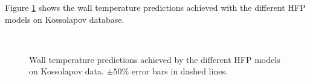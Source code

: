 \npar

Figure \ref{fig:HFP_koss} shows the wall temperature predictions achieved with the different HFP models on Kossolapov database.


\begin{figure}[!h]
\centering
{}
\\

\caption{Wall temperature predictions achieved by the different HFP models on Kossolapov data. $\pm 50\%$ error bars in dashed lines.}
\label{fig:HFP_koss}
\end{figure}

